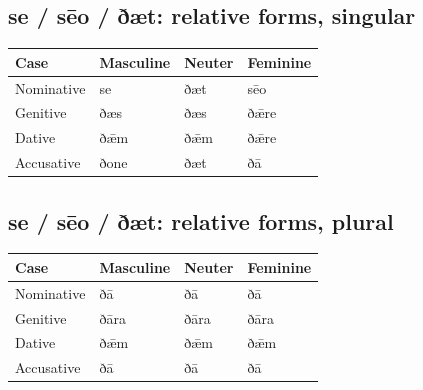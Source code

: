 \subsection*{se /\allowbreak{} sēo /\allowbreak{} ðæt: relative forms, singular}

\par\begingroup
\fontsize{10.5}{13.2}\selectfont
\setlength{\LTleft}{0pt}\setlength{\LTright}{\fill}
\noindent
\begin{tabular}{@{}>{\raggedright\arraybackslash}p{28.89mm}>{\raggedright\arraybackslash}p{28.89mm}>{\raggedright\arraybackslash}p{28.89mm}>{\raggedright\arraybackslash}p{28.89mm}@{}}
\toprule
\textbf{Case} & \textbf{Masculine} & \textbf{Neuter} & \textbf{Feminine} \\
\midrule
Nominative & se & ðæt & sēo \\
Genitive & ðæs & ðæs & ðǣre \\
Dative & ðǣm & ðǣm & ðǣre \\
Accusative & ðone & ðæt & ðā \\
\bottomrule
\end{tabular}
\par\endgroup

\subsection*{se /\allowbreak{} sēo /\allowbreak{} ðæt: relative forms, plural}

\par\begingroup
\fontsize{10.5}{13.2}\selectfont
\setlength{\LTleft}{0pt}\setlength{\LTright}{\fill}
\noindent
\begin{tabular}{@{}>{\raggedright\arraybackslash}p{28.89mm}>{\raggedright\arraybackslash}p{28.89mm}>{\raggedright\arraybackslash}p{28.89mm}>{\raggedright\arraybackslash}p{28.89mm}@{}}
\toprule
\textbf{Case} & \textbf{Masculine} & \textbf{Neuter} & \textbf{Feminine} \\
\midrule
Nominative & ðā & ðā & ðā \\
Genitive & ðāra & ðāra & ðāra \\
Dative & ðǣm & ðǣm & ðǣm \\
Accusative & ðā & ðā & ðā \\
\bottomrule
\end{tabular}
\par\endgroup

